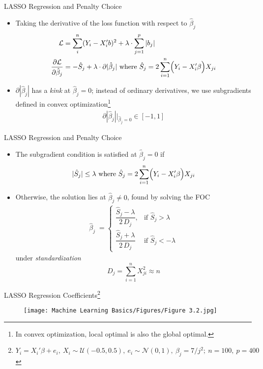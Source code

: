 \documentclass[aspectratio=1610,12pt,xcolor=dvipsnames]{beamer}
\begin{document}
\begin{frame}{LASSO Regression and Penalty Choice}

\begin{itemize}
    \item Taking the derivative of the loss function with respect to $\hat \beta_j$
    \begin{align*}
        \mathcal{L} &= \sum_i^n(Y_i - X_i'b)^2 + \lambda \cdot \sum_{j=1}^{p}|b_j| \\
        \frac{\partial \mathcal{L}}{\partial \hat \beta_j} &= -\hat S_j + \lambda \cdot \partial |\hat \beta_j| \text{ where } \hat S_j = 2\sum_{i=1}^n \Bigl(Y_i - X_{i}'\beta\Bigr)X_{ji}
    \end{align*}
    \item $\partial |\hat \beta_j|$ has a \textit{kink} at $\hat \beta_j = 0$; instead of ordinary derivatives, we use subgradients defined in convex optimization\footnote{In convex optimization, local optimal is also the global optimal.} 
    \begin{align*}
        \partial |\hat \beta_j| \Big|_{\hat \beta_j=0} \in [-1,1]
    \end{align*}
\end{itemize} 
\end{frame}

\begin{frame}{LASSO Regression and Penalty Choice}

\begin{itemize}
    \item The subgradient condition is satisfied at $\hat\beta_j = 0$ if
    \[
        |\hat S_j| \leq \lambda  \text{ where } \hat S_j = 2\sum_{i=1}^n \Bigl(Y_i - X_{i}'\beta\Bigr)X_{ji}
    \]
    \item Otherwise, the solution lies at $\hat\beta_j \neq 0$, found by solving the FOC
    \begin{align*}
    \hat\beta_j \;=
    \begin{cases}
    \dfrac{\hat S_j - \lambda}{2\,D_j}, & \text{if } \hat S_j > \lambda\\[10pt]
    \dfrac{\hat S_j + \lambda}{2\,D_j} & \text{if } \hat S_j < -\lambda
    \end{cases} 
    \end{align*}
    under \textit{standardization} $$D_j = \sum_{i=1}^n X_{ji}^2\approx n$$
\end{itemize}
\end{frame}

\begin{frame}{LASSO Regression Coefficients\footnote{\vspace{-10pt}$Y_i = X_i'\beta + e_i, \: X_i \sim \mathcal{U}(-0.5,0.5), \: e_i \sim \mathcal{N}(0,1), \: \beta_j = 7/j^2; \: n=100, \: p=400$}}
\begin{figure}
    \centering
    \texttt{[image: Machine Learning Basics/Figures/Figure 3.2.jpg]}
    \label{fig:figure3.2}
\end{figure}
    
\end{frame}
\end{document}
